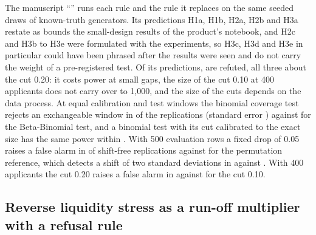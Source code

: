 The manuscript ``\pxPaperTitleTen{}'' runs each rule and the rule it replaces on the same seeded draws of known-truth generators. Its predictions H1a, H1b, H2a, H2b and H3a restate as bounds the small-design
results of the product's notebook, and H2c and H3b to H3e were formulated with the experiments, so H3c, H3d and H3e in particular could have been phrased after the results were seen and do not carry the weight of a
pre-registered test. Of its \pxPpTenHypTotal{} predictions, \pxPpTenHypRefuted{} are refuted, all three about the cut 0.20: it costs power at small gaps, the size of the cut 0.10 at 400 applicants does not carry over to 1,000,
and the size of the cuts depends on the data process. At equal calibration and test windows the binomial coverage test rejects an exchangeable window in \pxPpTenBinomEqual{} of the replications (standard error
\pxPpTenBinomEqualSe{}) against \pxPpTenBetaBin{} for the Beta-Binomial test, and a binomial test with its cut calibrated to the exact size has the same power within \pxPpTenPowGap{}. With 500 evaluation rows a fixed
drop of 0.05 raises a false alarm in \pxPpTenFixedFive{} of shift-free replications against \pxPpTenPerm{} for the permutation reference, which detects a shift of two standard deviations in \pxPpTenPermPower{} against
\pxPpTenFixedPower{}. With 400 applicants the cut 0.20 raises a false alarm in \pxPpTenCutTwenty{} against \pxPpTenCutTen{} for the cut 0.10.

\subsection{Reverse liquidity stress as a run-off multiplier with a refusal rule}
\label{sec:bs11}

